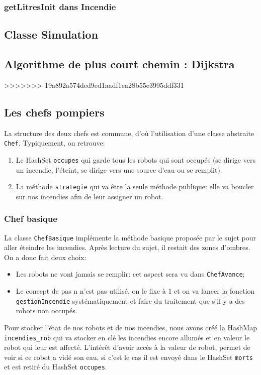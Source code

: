 \documentclass[a4paper,8pt]{article} %
\begin{document}
\subsubsection{getLitresInit dans Incendie}
\subsection{Classe Simulation}
\subsection{Algorithme de plus court chemin : Dijkstra} %
>>>>>>> 19a892a574ded9ed1aadf1ea28b55e3995ddf331
\subsection{Les chefs pompiers}
La structure des deux chefs est commune, d'où l'utilisation d'une classe abstraite \texttt{Chef}. Typiquement, on retrouve:
\begin{enumerate}
    \item Le HashSet \texttt{occupes} qui garde tous les robots qui sont occupés (se dirige vers un incendie, l'éteint,
    se dirige vers une source d'eau ou se remplit).
    \item La méthode \texttt{strategie} qui va être la seule méthode publique: elle va boucler sur nos incendies afin de leur assigner un robot.
\end{enumerate}

\subsubsection{Chef basique}
La  classe \texttt{ChefBasique} implémente la méthode basique proposée par le sujet pour aller éteindre les incendies.
Après lecture du sujet, il restait des zones d'ombres. On a donc fait deux choix:
\begin{itemize}
    \item Les robots ne vont jamais se remplir: cet aspect sera vu dans \texttt{ChefAvance};
    \item Le concept de pas n n'est pas utilisé, on le fixe à 1 et on va lancer la fonction \texttt{gestionIncendie} systématiquement 
    et faire du traitement que s'il y a des robots non occupés.
\end{itemize}

Pour stocker l'état de nos robots et de nos incendies, nous avons créé la HashMap \texttt{incendies\_rob} 
qui va stocker en clé les incendies encore allumés et en valeur le robot qui leur est affecté. L'intérêt d'avoir accès à la valeur de robot,
permet de voir si ce robot a vidé son eau, si c'est le cas il est envoyé dans le HashSet \texttt{morts} et est retiré du HashSet \texttt{occupes}.
\end{document}
